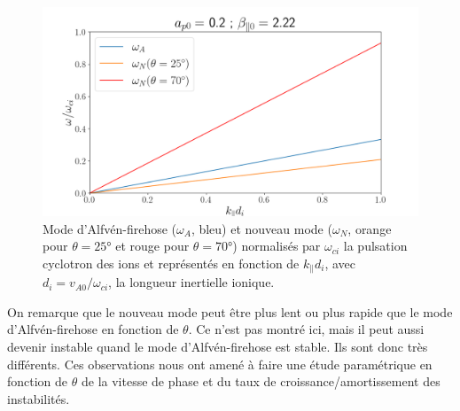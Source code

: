  \begin{figure}[!ht]
  \centering
 \includegraphics[width=0.8\linewidth,trim=2cm 0cm 3cm 1cm, clip=true]{./Mainmatter/Part_2/images/lin_omega_k}
 \cprotect\caption{Mode d'Alfvén-firehose (\ensuremath{\omega_A}, bleu) et nouveau mode (\ensuremath{\omega_N}, orange pour \ensuremath{\theta = \ang{25}} et rouge pour \ensuremath{\theta=\ang{70}}) normalisés par \ensuremath{\omega_{ci}} la pulsation cyclotron des ions et représentés en fonction de \ensuremath{k_{\parallel}d_i}, avec \ensuremath{d_i = v_{A0}/ \omega_{ci}}, la longueur inertielle ionique. } 
 \label{fig:lin_omega_k}
 \end{figure}
 On remarque que le nouveau mode peut être plus lent ou plus rapide que le mode d'Alfvén-firehose en fonction de $\theta$. Ce n'est pas montré ici, mais il peut aussi devenir instable quand le mode d'Alfvén-firehose est stable. Ils sont donc très différents. Ces observations nous ont amené à faire une étude paramétrique en fonction de $\theta$ de la vitesse de phase et du taux de croissance/amortissement des instabilités. 

